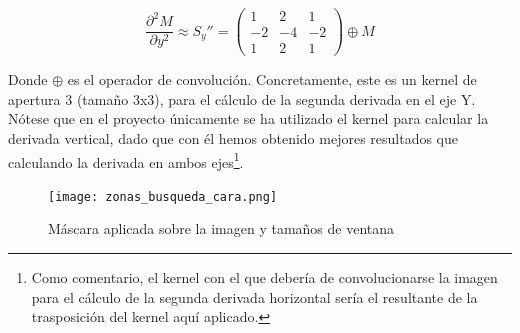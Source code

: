 \[ \frac{\partial^{2}{M}}{\partial{y^{2}}} \approx S_{y}''= \left( \begin{array}{ccc} 1 & 2 & 1 \\ -2 & -4 & -2 \\ 1 & 2 & 1  \end{array} \right) \oplus M \]

Donde $\oplus$ es el operador de convolución. Concretamente, este es un kernel de apertura 3 (tamaño 3x3), para el cálculo de la segunda derivada en el eje Y. Nótese que en el proyecto únicamente se ha utilizado el kernel para calcular la derivada vertical, dado que con él hemos obtenido mejores resultados que calculando la derivada en ambos ejes\footnote{Como comentario, el kernel con el que debería de convolucionarse la imagen para el cálculo de la segunda derivada horizontal sería el resultante de la trasposición del kernel aquí aplicado.}.

\begin{figure}[h!]
	\centering
	\texttt{[image: zonas\_busqueda\_cara.png]}
	\caption{Máscara aplicada sobre la imagen y tamaños de ventana}
	\label{fig:imagen_mascaras}
\end{figure}

